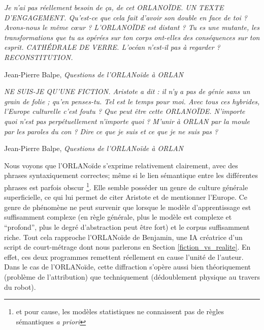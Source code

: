 \documentclass{article}
\newenvironment{citationbox}
{\begin{center}
		\begin{minipage}{.8\textwidth}
		}
		{
		\end{minipage}	
\end{center}
}
\begin{document}
				\begin{citationbox}
					\textit{Je n'ai pas réellement besoin de ça, de cet ORLANOÏDE. UN TEXTE D’ENGAGEMENT. Qu'est-ce que cela fait d’avoir son double en face de toi ? Avons-nous le même cœur ? L'ORLANOÏDE est distant ? Tu es une mutante, les transformations que tu as opérées sur ton corps ont-elles des conséquences sur ton esprit. CATHÉDRALE DE VERRE. L'océan n'est-il pas à regarder ? RECONSTITUTION.}
					\begin{flushright}
						Jean-Pierre Balpe, \textit{Questions de l'ORLANoïde à ORLAN} \cite{balpe_site}
					\end{flushright}
				\end{citationbox}
				\begin{citationbox}
					\textit{NE SUIS-JE QU'UNE FICTION. Aristote a dit : il n'y a pas de génie sans un grain de folie ; qu’en penses-tu. Tel est le temps pour moi. Avec tous ces hybrides, l’Europe culturelle c'est foutu ? Que peut être cette ORLANOÏDE. N'importe quoi n'est pas perpétuellement n'importe quoi ? M'unir à ORLAN par la moule par les paroles du con ? Dire ce que je suis et ce que je ne suis pas ?}
					\begin{flushright}
						Jean-Pierre Balpe, \textit{Questions de l'ORLANoïde à ORLAN} \cite{balpe_site}
					\end{flushright}
				\end{citationbox}
				Nous voyons que l'ORLANoïde s'exprime relativement clairement, avec des phrases syntaxiquement correctes; même si le lien sémantique entre les différentes phrases est parfois obscur \footnote{et pour cause, les modèles statistiques ne connaissent pas de règles sémantiques \textit{a priori}}. Elle semble posséder un genre de culture générale superficielle, ce qui lui permet de citer Aristote et de mentionner l'Europe. Ce genre de phénomène ne peut survenir que lorsque le modèle d'apprentissage est suffisamment complexe (en règle générale, plus le modèle est complexe et ``profond'', plus le degré d'abstraction peut être fort) et le corpus suffisamment riche. Tout cela rapproche l'ORLANoïde de Benjamin, une IA créatrice d'un script de court-métrage dont nous parlerons en Section \ref{fiction_vs_realite}. En effet, ces deux programmes remettent réellement en cause l'unité de l'auteur. Dans le cas de l'ORLANoïde, cette diffraction s'opère aussi bien théoriquement (problème de l'attribution) que techniquement (dédoublement physique au travers du robot).
				
\end{document}
